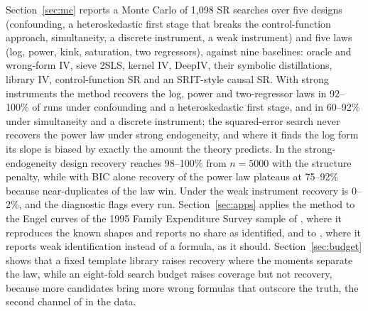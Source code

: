 Section~\ref{sec:mc} reports a Monte Carlo of 1{,}098 SR searches over five designs (confounding, a heteroskedastic first stage that breaks the control-function approach, simultaneity, a discrete instrument, a weak instrument) and five laws (log, power, kink, saturation, two regressors), against nine baselines: oracle and wrong-form IV, sieve 2SLS, kernel IV, DeepIV, their symbolic distillations, library IV, control-function SR and an SRIT-style causal SR. With strong instruments the method recovers the log, power and two-regressor laws in 92--100\% of runs under confounding and a heteroskedastic first stage, and in 60--92\% under simultaneity and a discrete instrument; the squared-error search never recovers the power law under strong endogeneity, and where it finds the log form its slope is biased by exactly the amount the theory predicts. In the strong-endogeneity design recovery reaches 98--100\% from $n = 5000$ with the structure penalty, while with BIC alone recovery of the power law plateaus at 75--92\% because near-duplicates of the law win. Under the weak instrument recovery is 0--2\%, and the diagnostic flags every run. Section~\ref{sec:apps} applies the method to the Engel curves of the 1995 Family Expenditure Survey sample of \citet{bck2007}, where it reproduces the known shapes and reports no share as identified, and to \citet{angristkrueger1991}, where it reports weak identification instead of a formula, as it should. Section~\ref{sec:budget} shows that a fixed template library raises recovery where the moments separate the law, while an eight-fold search budget raises coverage but not recovery, because more candidates bring more wrong formulas that outscore the truth, the second channel of  in the data.

